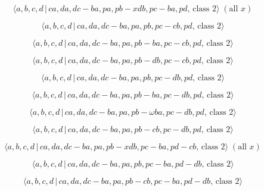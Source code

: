 \documentclass[10pt]{article}
\begin{document}
\begin{equation}
\langle a,b,c,d\,|\,ca,da,dc-ba,pa,pb-xdb,pc-ba,pd,\,\text{class }2\rangle
\;(\text{all }x)  \tag{7.3222}
\end{equation}

\begin{equation}
\langle a,b,c,d\,|\,ca,da,dc-ba,pa,pb,pc-cb,pd,\,\text{class }2\rangle 
\tag{7.3223}
\end{equation}

\begin{equation}
\langle a,b,c,d\,|\,ca,da,dc-ba,pa,pb-ba,pc-cb,pd,\,\text{class }2\rangle 
\tag{7.3224}
\end{equation}

\begin{equation}
\langle a,b,c,d\,|\,ca,da,dc-ba,pa,pb-db,pc-cb,pd,\,\text{class }2\rangle 
\tag{7.3225}
\end{equation}

\begin{equation}
\langle a,b,c,d\,|\,ca,da,dc-ba,pa,pb,pc-db,pd,\,\text{class }2\rangle 
\tag{7.3226}
\end{equation}

\begin{equation}
\langle a,b,c,d\,|\,ca,da,dc-ba,pa,pb-ba,pc-db,pd,\,\text{class }2\rangle 
\tag{7.3227}
\end{equation}

\begin{equation}
\langle a,b,c,d\,|\,ca,da,dc-ba,pa,pb-\omega ba,pc-db,pd,\,\text{class }%
2\rangle  \tag{7.3228}
\end{equation}

\begin{equation}
\langle a,b,c,d\,|\,ca,da,dc-ba,pa,pb-cb,pc-db,pd,\,\text{class }2\rangle 
\tag{7.3229}
\end{equation}

\begin{equation}
\langle a,b,c,d\,|\,ca,da,dc-ba,pa,pb-xdb,pc-ba,pd-cb,\,\text{class }%
2\rangle \;(\text{all }x)  \tag{7.3230}
\end{equation}

\begin{equation}
\langle a,b,c,d\,|\,ca,da,dc-ba,pa,pb,pc-ba,pd-db,\,\text{class }2\rangle 
\tag{7.3231}
\end{equation}

\begin{equation}
\langle a,b,c,d\,|\,ca,da,dc-ba,pa,pb-cb,pc-ba,pd-db,\,\text{class }2\rangle
\tag{7.3232}
\end{equation}
\end{document}
